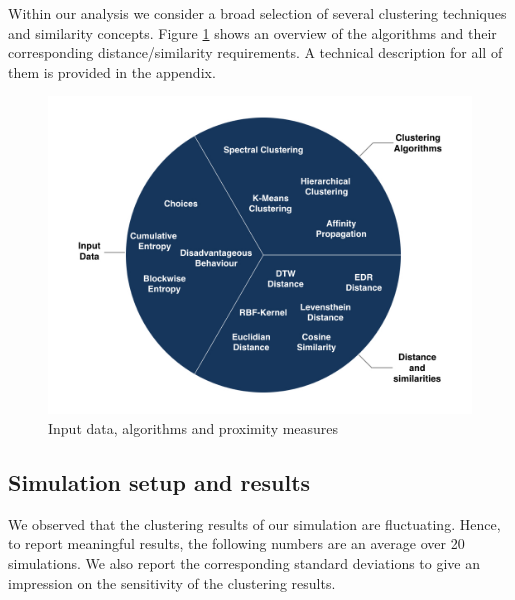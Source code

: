 \documentclass[12pt,a4paper,bibliography=totocnumbered,listof=totocnumbered]{scrartcl}
\begin{document}
Within our analysis we consider a broad selection of several clustering techniques and similarity concepts. Figure \ref{fig:cla} shows an overview of the algorithms and their corresponding distance/similarity requirements. A technical description for all of them is provided in the appendix. 

\begin{figure}[H]
	\includegraphics[width=\textwidth]{Pictures/DataClustering.jpeg}
	\caption{Input data, algorithms and proximity measures}
	\label{fig:cla}
\end{figure}

\subsection{Simulation setup and results}

We observed that the clustering results of our simulation are fluctuating. Hence, to report meaningful results, the following numbers are an average over 20 simulations. We also report the corresponding standard deviations to give an impression on the sensitivity of the clustering results.\\
\end{document}
